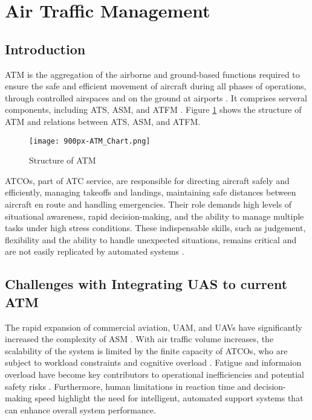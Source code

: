 \section{Air Traffic Management}

\subsection{Introduction}

\Gls{ATM} is the aggregation of the airborne and ground-based functions required to ensure the safe and efficient movement of aircraft during all phases of operations, through controlled airspaces and on the ground at airports \cite{skybraryATM}.
It comprises serveral components, including \gls{ATS}, \gls{ASM}, and \gls{ATFM} \cite{skybraryATM}.
Figure \ref{fig:atm-structure} shows the structure of \gls{ATM} and relations between \gls{ATS}, \gls{ASM}, and \gls{ATFM}.

\begin{figure}[h]
    \centering
    \texttt{[image: 900px-ATM\_Chart.png]}
    \caption{Structure of \gls{ATM} \cite{skybraryATM}}
    \label{fig:atm-structure}
\end{figure}

\Glspl{ATCO}, part of \gls{ATC} service, are responsible for directing aircraft safely and efficiently, managing takeoffs and landings, maintaining safe distances between aircraft en route and handling emergencies. 
Their role demands high levels of situational awareness, rapid decision-making, and the ability to manage multiple tasks under high stress conditions.
These indispensable skills, such as judgement, flexibility and the ability to handle unexpected situations, remains critical and are not easily replicated by automated systems \cite{eurocontrol2024digitalisation}.



\subsection{Challenges with Integrating UAS to current ATM}

The rapid expansion of commercial aviation, \gls{UAM}, and \glspl{UAV} have significantly increased the complexity of \gls{ASM} \cite{Ramachandran_2025}.
With air traffic volume increases, the scalability of the system is limited by the finite capacity of \glspl{ATCO}, who are subject to workload constraints and cognitive overload \cite{Meier_2024}.
Fatigue and informaion overload  have become key contributors to operational inefficiencies and potential safety risks \cite{Ramachandran_2025}. 
Furthermore, human limitations in reaction time and decision-making speed highlight the need for intelligent, automated support systems that can enhance overall system performance.


